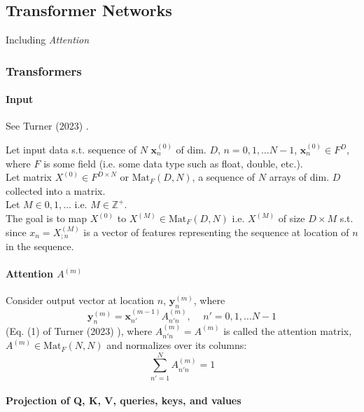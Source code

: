 \documentclass[10pt]{amsart}
\begin{document}
\begin{multicols*}{2}
\part{Transformer Networks}

Including \emph{Attention}

\section{Transformers}

\subsection{Input}

See Turner (2023) \cite{Turn2023}.

Let input data s.t. sequence of $N$ $\mathbf{x}^{(0)}_n$ of dim. $D$, $n = 0,1, \dots N-1$, $\mathbf{x}_n^{(0)} \in F^D$, where $F$ is some field (i.e. some data type such as float, double, etc.). \\

Let matrix $X^{(0)} \in F^{D\times N}$ or $\text{Mat}_F(D, N)$, a sequence of $N$ arrays of dim. $D$ collected into a matrix. \\

Let $M \in 0,1,\dots $ i.e. $M \in \mathbb{Z}^+$. \\

The goal is to map $X^{(0)}$ to $X^{(M)} \in \text{Mat}_F(D,N)$ i.e. $X^{(M)}$ of size $D\times M$ s.t. since $x_n = X_{;n}^{(M)}$ is a vector of features representing the sequence at location of $n$ in the sequence.

\subsection{Attention $A^{(m)}$ }

Consider output vector at location $n$, $\mathbf{y}_n^{(m)}$, where 
\begin{equation}
\mathbf{y}_n^{(m)} = \mathbf{x}^{(m -1)}_{n'} A^{(m)}_{n' n}, \quad \, n' = 0,1, \dots N-1
\end{equation} 
(Eq. (1) of Turner (2023) \cite{Turn2023}), where $A^{(m)}_{n' n} = A^{(m)}$ is called the attention matrix, $A^{(m)} \in \text{Mat}_F(N, N)$ and normalizes over its columns:
\begin{equation}
\sum_{n' = 1}^N A^{(m)}_{n' n}  =1
\end{equation}

\subsection{Projection of Q, K, V, queries, keys, and values}


\end{multicols*}
\end{document}
